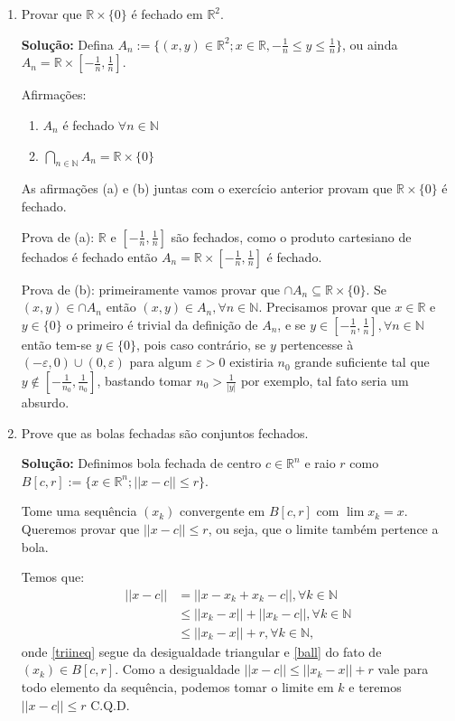\documentclass[12pt]{article}
\newcommand{\R}{\mathbb{R}}
\newcommand{\N}{\mathbb{N}}
\newcommand{\eps}{\varepsilon}
\newcommand{\rr}{\mathbb{R}^2}
\newcommand{\rn}{\mathbb{R}^n}
\newcommand{\dps}{\displaystyle}
\begin{document}
\begin{enumerate}
$(\Leftarrow)$ Se $A=\dps\bigcup_{\lambda\in I}B(\lambda,\delta_\lambda)$ então $A$ é aberto.

Tome $x\in A$ arbitrário, mas fixo; Queremos provar que $\exists\delta>0$ tal que $B(x,\delta)\subseteq A$. Mas se $x\in A$, então $\exists\lambda^* \in I$ tal que $x\in B(\lambda^*,\delta_{\lambda^*})\subseteq A$. Tome então $\delta=\lambda^*$ e temos os resultado.

\item Provar que $\mathbb{R}\times \{0\}$ \'e fechado em $\mathbb{R}^2$.

\textbf{Solução:} Defina $A_n:=\{(x,y)\in\rr;x\in\R,-\frac1n\leq y\leq \frac1n\}$, ou ainda $A_n=\R\times[-\frac1n,\frac1n]$.

Afirmações:

\begin{enumerate}
	\item $A_n$ é fechado $\forall n \in \N$
	\item $\dps\bigcap_{n\in\N}A_n=\R\times\{0\}$
\end{enumerate}

As afirmações (a) e (b) juntas com o exercício anterior provam que $\R\times\{0\}$ é fechado. 

Prova de (a): $\R$ e $[-\frac1n,\frac1n]$ são fechados, como o produto cartesiano de fechados é fechado\cite{analise2} então $A_n=\R\times[-\frac1n,\frac1n]$ é fechado.

Prova de (b): primeiramente vamos provar que $\cap A_n\subseteq \R\times\{0\}$. Se $(x,y)\in\cap A_n$ então $(x,y)\in A_n,\forall n\in\N$. Precisamos provar que $x\in\R$ e $y\in\{0\}$ o primeiro é trivial da definição de $A_n$, e se $y\in[-\frac1n,\frac1n],\forall n\in\N$ então tem-se $y\in\{0\}$, pois caso contrário, se $y$ pertencesse à $(-\eps,0)\cup(0,\eps)$ para algum $\eps>0$ existiria $n_0$ grande suficiente tal que $y\notin[-\frac1{n_0},\frac1{n_0}]$, bastando tomar $n_0>\frac1{|y|}$ por exemplo, tal fato seria um absurdo.



\item Prove que as bolas fechadas s\~ao conjuntos fechados.

\textbf{Solução:} Definimos bola fechada de centro $c\in\rn$ e raio $r$ como $B[c,r]:=\{x\in\rn;||x-c||\leq r\}$.

Tome uma sequência $(x_k)$ convergente em $B[c,r]$ com $\lim x_k=x$. Queremos provar que $||x-c||\leq r$, ou seja, que o limite também pertence a bola.

Temos que:
\begin{align}
	||x-c||&=||x-x_k+x_k-c||,\forall k\in\N\nonumber\\
	&\leq ||x_k-x||+||x_k-c||,\forall k\in\N\label{triineq}\\
	&\leq ||x_k-x||+r,\forall k\in\N,\label{ball}
\end{align}
onde \ref{triineq} segue da desigualdade triangular e \ref{ball} do fato de $(x_k)\in B[c,r]$. Como a desigualdade $||x-c||\leq ||x_k-x||+r$ vale para todo elemento da sequência, podemos tomar o limite em $k$ e teremos $||x-c||\leq r$ C.Q.D.


\end{enumerate}
\end{document}
